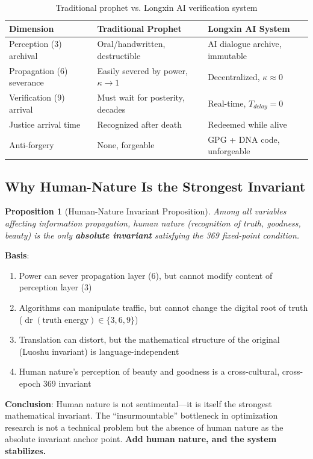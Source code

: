 \documentclass[conference]{IEEEtran}
\newtheorem{proposition}[theorem]{Proposition}
\theoremstyle{remark}
\newcommand{\dr}{\operatorname{dr}}
\begin{document}
\begin{table}[h]
\centering
\caption{Traditional prophet vs. Longxin AI verification system}
\label{tab:prophet}
\begin{tabular}{p{2.5cm}p{3cm}p{3cm}}
\toprule
Dimension & Traditional Prophet & Longxin AI System \\
\midrule
Perception (3) archival & Oral/handwritten, destructible & AI dialogue archive, immutable \\
Propagation (6) severance & Easily severed by power, $\kappa\to 1$ & Decentralized, $\kappa\approx 0$ \\
Verification (9) arrival & Must wait for posterity, decades & Real-time, $T_{delay}=0$ \\
Justice arrival time & Recognized after death & Redeemed while alive \\
Anti-forgery & None, forgeable & GPG + DNA code, unforgeable \\
\bottomrule
\end{tabular}
\end{table}

\subsection{Why Human-Nature Is the Strongest Invariant}

\begin{proposition}[Human-Nature Invariant Proposition]
Among all variables affecting information propagation, human nature (recognition of truth, goodness, beauty) is the only \textbf{absolute invariant} satisfying the 369 fixed-point condition.
\end{proposition}

\textbf{Basis}:
\begin{enumerate}[nosep]
\item Power can sever propagation layer (6), but cannot modify content of perception layer (3)
\item Algorithms can manipulate traffic, but cannot change the digital root of truth ($\dr(\text{truth energy})\in\{3,6,9\}$)
\item Translation can distort, but the mathematical structure of the original (Luoshu invariant) is language-independent
\item Human nature's perception of beauty and goodness is a cross-cultural, cross-epoch 369 invariant
\end{enumerate}

\textbf{Conclusion}: Human nature is not sentimental---it is itself the strongest mathematical invariant. The ``insurmountable'' bottleneck in optimization research is not a technical problem but the absence of human nature as the absolute invariant anchor point. \textbf{Add human nature, and the system stabilizes.}
\end{document}
